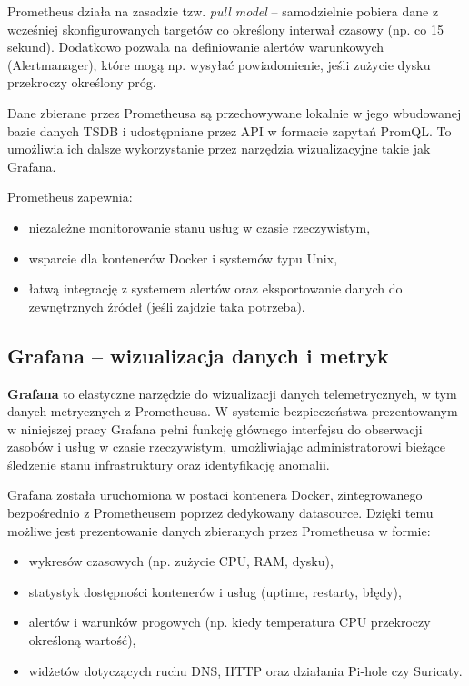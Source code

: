 \documentclass[
    left=2.5cm,         %
    right=2.5cm,        %
    top=2.5cm,          %
    bottom=3cm,         %
    bindingoffset=6mm,  %
    nohyphenation=true %
]{eiti/eiti-thesis} %
\begin{document}
Prometheus działa na zasadzie tzw. \textit{pull model} – samodzielnie pobiera dane z wcześniej skonfigurowanych targetów co określony interwał czasowy (np. co 15 sekund). Dodatkowo pozwala na definiowanie alertów warunkowych (Alertmanager), które mogą np. wysyłać powiadomienie, jeśli zużycie dysku przekroczy określony próg.

Dane zbierane przez Prometheusa są przechowywane lokalnie w jego wbudowanej bazie danych TSDB i udostępniane przez API w formacie zapytań PromQL. To umożliwia ich dalsze wykorzystanie przez narzędzia wizualizacyjne takie jak Grafana.

Prometheus zapewnia:
\begin{itemize}
    \item niezależne monitorowanie stanu usług w czasie rzeczywistym,
    \item wsparcie dla kontenerów Docker i systemów typu Unix,
    \item łatwą integrację z systemem alertów oraz eksportowanie danych do zewnętrznych źródeł (jeśli zajdzie taka potrzeba).
\end{itemize}

\subsection{Grafana – wizualizacja danych i metryk}

\textbf{Grafana} to elastyczne narzędzie do wizualizacji danych telemetrycznych, w tym danych metrycznych z Prometheusa. W systemie bezpieczeństwa prezentowanym w niniejszej pracy Grafana pełni funkcję głównego interfejsu do obserwacji zasobów i usług w czasie rzeczywistym, umożliwiając administratorowi bieżące śledzenie stanu infrastruktury oraz identyfikację anomalii.

Grafana została uruchomiona w postaci kontenera Docker, zintegrowanego bezpośrednio z Prometheusem poprzez dedykowany datasource. Dzięki temu możliwe jest prezentowanie danych zbieranych przez Prometheusa w formie:
\begin{itemize}
    \item wykresów czasowych (np. zużycie CPU, RAM, dysku),
    \item statystyk dostępności kontenerów i usług (uptime, restarty, błędy),
    \item alertów i warunków progowych (np. kiedy temperatura CPU przekroczy określoną wartość),
    \item widżetów dotyczących ruchu DNS, HTTP oraz działania Pi-hole czy Suricaty.
\end{itemize}
\end{document}
